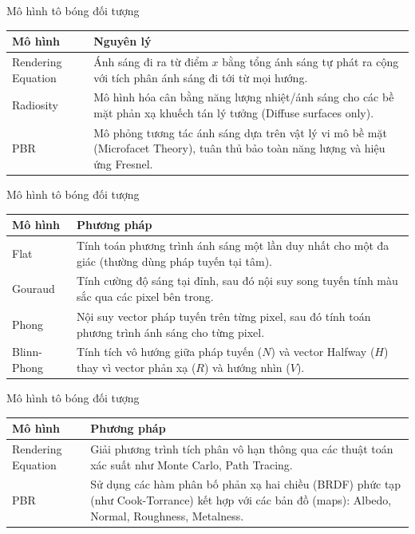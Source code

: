 \documentclass[11pt, aspectratio=169]{beamer}
\begin{document}
\begin{frame}{Mô hình tô bóng đối tượng}
	\begin{table}[h]
		\centering
		\begin{tabular}{|l|p{10cm}|}
			\hline
			\textbf{Mô hình} & \textbf{Nguyên lý} \\ \hline
			Rendering Equation & Ánh sáng đi ra từ điểm $x$ bằng tổng ánh sáng tự phát ra cộng với tích phân ánh sáng đi tới từ mọi hướng. \\ \hline
			Radiosity & Mô hình hóa cân bằng năng lượng nhiệt/ánh sáng cho các bề mặt phản xạ khuếch tán lý tưởng (Diffuse surfaces only). \\ \hline
			PBR & Mô phỏng tương tác ánh sáng dựa trên vật lý vi mô bề mặt (Microfacet Theory), tuân thủ bảo toàn năng lượng và hiệu ứng Fresnel. \\ \hline
		\end{tabular}
	\end{table}
\end{frame}

\begin{frame}{Mô hình tô bóng đối tượng}
	\begin{table}[h]
		\centering
		\begin{tabular}{|l|p{10cm}|}
			\hline
			\textbf{Mô hình} & \textbf{Phương pháp} \\ \hline
			Flat & Tính toán phương trình ánh sáng một lần duy nhất cho một đa giác (thường dùng pháp tuyến tại tâm). \\ \hline
			Gouraud & Tính cường độ sáng tại đỉnh, sau đó nội suy song tuyến tính màu sắc qua các pixel bên trong. \\ \hline
			Phong & Nội suy vector pháp tuyến trên từng pixel, sau đó tính toán phương trình ánh sáng cho từng pixel. \\ \hline
			Blinn-Phong & Tính tích vô hướng giữa pháp tuyến ($N$) và vector Halfway ($H$) thay vì vector phản xạ ($R$) và hướng nhìn ($V$). \\ \hline
		\end{tabular}
	\end{table}
\end{frame}

\begin{frame}{Mô hình tô bóng đối tượng}
	\begin{table}[h]
		\centering
		\begin{tabular}{|l|p{10cm}|}
			\hline
			\textbf{Mô hình} & \textbf{Phương pháp} \\ \hline
			Rendering Equation & Giải phương trình tích phân vô hạn thông qua các thuật toán xác suất như Monte Carlo, Path Tracing. \\ \hline
			PBR & Sử dụng các hàm phân bố phản xạ hai chiều (BRDF) phức tạp (như Cook-Torrance) kết hợp với các bản đồ (maps): Albedo, Normal, Roughness, Metalness. \\ \hline
		\end{tabular}
	\end{table}
\end{frame}
\end{document}
